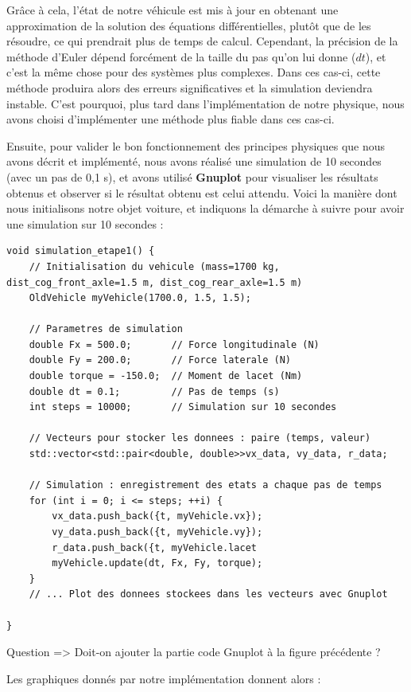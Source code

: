 Grâce à cela, l'état de notre véhicule est mis à jour en obtenant une approximation de la solution des équations différentielles, plutôt que de les résoudre, ce qui prendrait plus de temps de calcul.
Cependant, la précision de la méthode d'Euler dépend forcément de la taille du pas qu'on lui donne ($dt$), et c'est la même chose pour des systèmes plus complexes. Dans ces cas-ci, cette méthode produira alors des erreurs significatives et la simulation deviendra instable. C'est pourquoi, plus tard dans l'implémentation de notre physique, nous avons choisi d'implémenter une méthode plus fiable dans ces cas-ci.

Ensuite, pour valider le bon fonctionnement des principes physiques que nous avons décrit et implémenté, nous avons réalisé une simulation de 10 secondes (avec un pas de 0,1 s), et avons utilisé \textbf{Gnuplot} pour visualiser les résultats obtenus et observer si le résultat obtenu est celui attendu. Voici la manière dont nous initialisons notre objet voiture, et indiquons la démarche à suivre pour avoir une simulation sur 10 secondes :
\begin{lstlisting}[style=CStyle,label={lst:void_simulation_etape1}]
void simulation_etape1() {
    // Initialisation du vehicule (mass=1700 kg, dist_cog_front_axle=1.5 m, dist_cog_rear_axle=1.5 m)
    OldVehicle myVehicle(1700.0, 1.5, 1.5);

    // Parametres de simulation
    double Fx = 500.0;       // Force longitudinale (N)
    double Fy = 200.0;       // Force laterale (N)
    double torque = -150.0;  // Moment de lacet (Nm)
    double dt = 0.1;         // Pas de temps (s)
    int steps = 10000;       // Simulation sur 10 secondes

    // Vecteurs pour stocker les donnees : paire (temps, valeur)
    std::vector<std::pair<double, double>>vx_data, vy_data, r_data;

    // Simulation : enregistrement des etats a chaque pas de temps
    for (int i = 0; i <= steps; ++i) {
        vx_data.push_back({t, myVehicle.vx});
        vy_data.push_back({t, myVehicle.vy});
        r_data.push_back({t, myVehicle.lacet
        myVehicle.update(dt, Fx, Fy, torque);
    }
    // ... Plot des donnees stockees dans les vecteurs avec Gnuplot

}
\end{lstlisting}

{\LARGE Question => Doit-on ajouter la partie code Gnuplot à la figure précédente ?}

Les graphiques donnés par notre implémentation donnent alors :

